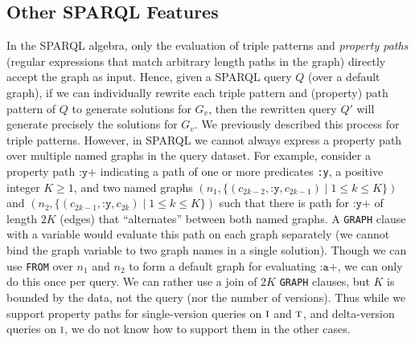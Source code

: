 \documentclass{llncs}
\makeatletter
\renewcommand\paragraph{\@startsection{paragraph}{4}{\z@}%
	{1ex \@plus1ex \@minus.2ex}%
	{-1em}%
	{\normalfont\normalsize\itshape}}
\newcommand{\ssyn}[3]{[\ensuremath{#1\,\textsc{#2}\,#3}]}
\newcommand{\suni}[2]{\ssyn{#1}{union}{#2}}
\newcommand{\sminus}[2]{\ssyn{#1}{minus}{#2}}
\newcommand{\sfrom}[3]{\ensuremath{\textsc{from}_{#2,#3}#1}}
\makeatother
\begin{document}
\subsection{Other SPARQL Features} 

In the SPARQL algebra, only the evaluation of triple patterns and \textit{property paths} (regular expressions that match arbitrary length paths in the graph) directly accept the graph as input. Hence, given a SPARQL query $Q$ (over a default graph), if we can individually rewrite each triple pattern and (property) path pattern of $Q$ to generate solutions for $G_v$, then the rewritten query $Q'$ will generate precisely the solutions for $G_v$. We previously described this process for triple patterns. However, in SPARQL we cannot always express a property path over multiple named graphs in the query dataset. For example, consider a property path $\texttt{:y+}$ indicating a path of one or more predicates \texttt{:y}, a positive integer $K \geq 1$, and two named graphs $(n_1,\{(c_{2k-2},\texttt{:y},c_{2k-1}) \mid 1 \leq k \leq K \})$ and $(n_2,\{(c_{2k-1},\texttt{:y},c_{2k}) \mid 1 \leq k \leq K \})$ such that there is path for $\texttt{:y+}$ of length $2K$ (edges) that ``alternates'' between both named graphs. A \texttt{GRAPH} clause with a variable would evaluate this path on each graph separately (we cannot bind the graph variable to two graph names in a single solution). Though we can use \texttt{FROM} over $n_1$ and $n_2$ to form a default graph for evaluating $\texttt{:a+}$, we can only do this once per query. We can rather use a join of $2K$ \texttt{GRAPH} clauses, but $K$ is bounded by the data, not the query (nor the number of versions). Thus while we support property paths for single-version queries on $\textsc{i}$ and $\textsc{t}$, and delta-version queries on $\textsc{i}$, we do not know how to support them in the other cases.


%
\end{document}
